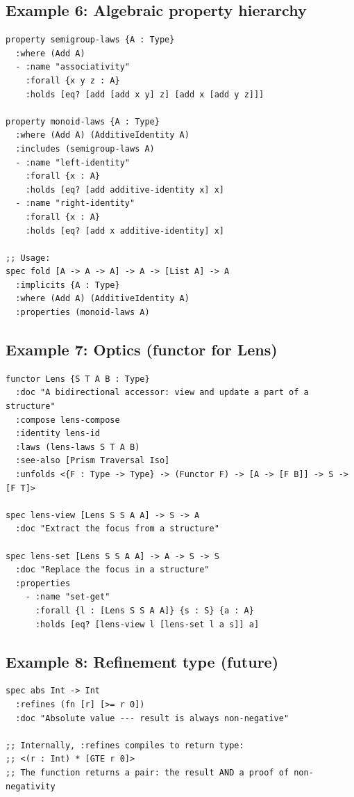 \documentclass[11pt]{article}
\begin{document}
\subsection{Example 6: Algebraic property hierarchy}
\label{sec:org245c983}

\begin{verbatim}
property semigroup-laws {A : Type}
  :where (Add A)
  - :name "associativity"
    :forall {x y z : A}
    :holds [eq? [add [add x y] z] [add x [add y z]]]

property monoid-laws {A : Type}
  :where (Add A) (AdditiveIdentity A)
  :includes (semigroup-laws A)
  - :name "left-identity"
    :forall {x : A}
    :holds [eq? [add additive-identity x] x]
  - :name "right-identity"
    :forall {x : A}
    :holds [eq? [add x additive-identity] x]

;; Usage:
spec fold [A -> A -> A] -> A -> [List A] -> A
  :implicits {A : Type}
  :where (Add A) (AdditiveIdentity A)
  :properties (monoid-laws A)
\end{verbatim}
\subsection{Example 7: Optics (functor for Lens)}
\label{sec:org7d8861f}

\begin{verbatim}
functor Lens {S T A B : Type}
  :doc "A bidirectional accessor: view and update a part of a structure"
  :compose lens-compose
  :identity lens-id
  :laws (lens-laws S T A B)
  :see-also [Prism Traversal Iso]
  :unfolds <{F : Type -> Type} -> (Functor F) -> [A -> [F B]] -> S -> [F T]>

spec lens-view [Lens S S A A] -> S -> A
  :doc "Extract the focus from a structure"

spec lens-set [Lens S S A A] -> A -> S -> S
  :doc "Replace the focus in a structure"
  :properties
    - :name "set-get"
      :forall {l : [Lens S S A A]} {s : S} {a : A}
      :holds [eq? [lens-view l [lens-set l a s]] a]
\end{verbatim}
\subsection{Example 8: Refinement type (future)}
\label{sec:org2f6bdb2}

\begin{verbatim}
spec abs Int -> Int
  :refines (fn [r] [>= r 0])
  :doc "Absolute value --- result is always non-negative"

;; Internally, :refines compiles to return type:
;; <(r : Int) * [GTE r 0]>
;; The function returns a pair: the result AND a proof of non-negativity
\end{verbatim}
\end{document}
